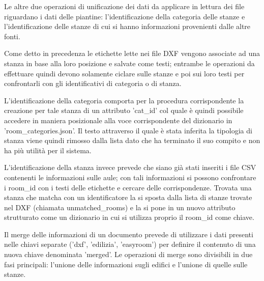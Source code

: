 \documentclass[12pt]{report}
\begin{document}
Le altre due operazioni di unificazione dei dati da applicare in lettura dei file riguardano i dati delle piantine: l'identificazione della categoria delle stanze e l'identificazione delle stanze di cui si hanno informazioni provenienti dalle altre fonti.

Come detto in precedenza le etichette lette nei file DXF vengono associate ad una stanza in base alla loro posizione e salvate come testi; entrambe le operazioni da effettuare quindi devono solamente ciclare sulle stanze e poi sui loro testi per confrontarli con gli identificativi di categoria o di stanza.

L'identificazione della categoria comporta per la procedura corrispondente la creazione per tale stanza di un attributo 'cat\_id' col quale è quindi possibile accedere in maniera posizionale alla voce corrispondente del dizionario in 'room\_categories.json'. 
Il testo attraverso il quale è stata inferita la tipologia di stanza viene quindi rimosso dalla lista dato che ha terminato il suo compito e non ha più utilità per il sistema.

L'identificazione della stanza invece prevede che siano già stati inseriti i file CSV contenenti le informazioni sulle aule; con tali informazioni si possono confrontare i room\_id con i testi delle etichette e cercare delle corrispondenze.
Trovata una stanza che matcha con un identificatore la si sposta dalla lista di stanze trovate nel DXF (chiamata unmatched\_rooms) e la si pone in un nuovo attributo strutturato come un dizionario in cui si utilizza proprio il room\_id come chiave. 

\vspace{5mm} %

Il merge delle informazioni di un documento prevede di utilizzare i dati presenti nelle chiavi separate ('dxf', 'edilizia', 'easyroom') per definire il contenuto di una nuova chiave denominata 'merged'.
Le operazioni di merge sono divisibili in due fasi principali: l'unione delle informazioni sugli edifici e l'unione di quelle sulle stanze.
\end{document}
